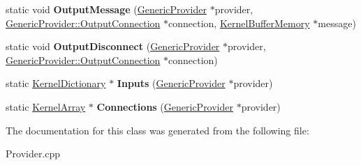 \begin{DoxyCompactItemize}
\item 
\mbox{\label{class_generic_provider___thunk_a6fe45b736110c95417c9c11402d89467}} 
static void {\bfseries Output\+Message} (\hyperlink{class_generic_provider}{Generic\+Provider} $\ast$provider, \hyperlink{class_generic_provider_1_1_output_connection}{Generic\+Provider\+::\+Output\+Connection} $\ast$connection, \hyperlink{class_kernel_buffer_memory}{Kernel\+Buffer\+Memory} $\ast$message)
\item 
\mbox{\label{class_generic_provider___thunk_a97a7b80984c8fa083544ab341178c98f}} 
static void {\bfseries Output\+Disconnect} (\hyperlink{class_generic_provider}{Generic\+Provider} $\ast$provider, \hyperlink{class_generic_provider_1_1_output_connection}{Generic\+Provider\+::\+Output\+Connection} $\ast$connection)
\item 
\mbox{\label{class_generic_provider___thunk_a60ea7e3ebdc70baffd9c1593fc3ab005}} 
static \hyperlink{class_kernel_dictionary}{Kernel\+Dictionary} $\ast$ {\bfseries Inputs} (\hyperlink{class_generic_provider}{Generic\+Provider} $\ast$provider)
\item 
\mbox{\label{class_generic_provider___thunk_a7b451e574d9c4c3340f17e47235b2d4e}} 
static \hyperlink{class_kernel_array}{Kernel\+Array} $\ast$ {\bfseries Connections} (\hyperlink{class_generic_provider}{Generic\+Provider} $\ast$provider)
\end{DoxyCompactItemize}


The documentation for this class was generated from the following file\+:\begin{DoxyCompactItemize}
\item 
Provider.\+cpp\end{DoxyCompactItemize}

